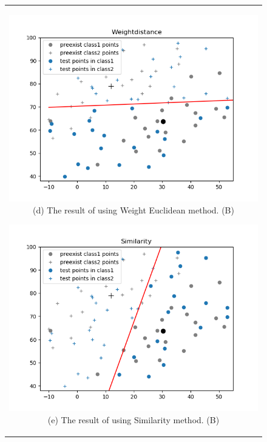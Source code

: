 \documentclass[10.5pt]{jsarticle}
\begin{document}
\begin{figure}[htbp]
  \centering
  \begin{tabular}{c}
  	\begin{minipage}{0.56\hsize}
  	\centering
  		\includegraphics[width=15.0cm, bb=9 9 700 270]{results/WeightdistanceResultFigureB.png}
  		\hspace{0cm} (d) The result of using Weight Euclidean method. (B)
  	\end{minipage}

  	\begin{minipage}{0.5\hsize}
  	\centering
  		\includegraphics[width=15.0cm, bb=9 9 700 270]{results/SimilarityResultFigureB.png}
  		\hspace{0cm} (e) The result of using Similarity method. (B)
  	\end{minipage}
  \end{tabular}
\end{figure}
\end{document}
